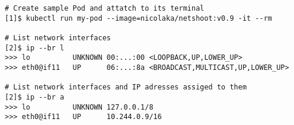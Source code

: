 \begin{lstfloat}
\begin{lstlisting}[style=mybashstyle,
caption={Nastavení síťových prostředků v podu},
label={cmd:podNet}
]
# Create sample Pod and attatch to its terminal
[1]$ kubectl run my-pod --image=nicolaka/netshoot:v0.9 -it --rm

# List network interfaces
[2]$ ip --br l
>>> lo          UNKNOWN 00:...:00 <LOOPBACK,UP,LOWER_UP> 
>>> eth0@if11   UP      06:...:8a <BROADCAST,MULTICAST,UP,LOWER_UP>

# List network interfaces and IP adresses assiged to them
[2]$ ip --br a
>>> lo          UNKNOWN 127.0.0.1/8 
>>> eth0@if11   UP      10.244.0.9/16  
\end{lstlisting}
\end{lstfloat}